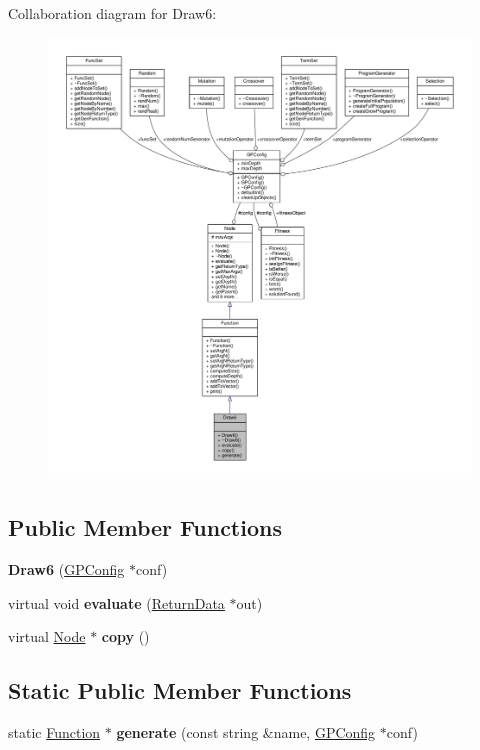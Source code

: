 Collaboration diagram for Draw6\+:
\nopagebreak
\begin{figure}[H]
\begin{center}
\leavevmode
\includegraphics[width=350pt]{classDraw6__coll__graph}
\end{center}
\end{figure}
\subsection*{Public Member Functions}
\begin{DoxyCompactItemize}
\item 
\hypertarget{classDraw6_a3ce8484795df7bd08600ee8a7d457852}{}\label{classDraw6_a3ce8484795df7bd08600ee8a7d457852} 
{\bfseries Draw6} (\hyperlink{classGPConfig}{G\+P\+Config} $\ast$conf)
\item 
\hypertarget{classDraw6_afc1c9a9b88e1857dc72e9d92abe7a701}{}\label{classDraw6_afc1c9a9b88e1857dc72e9d92abe7a701} 
virtual void {\bfseries evaluate} (\hyperlink{classReturnData}{Return\+Data} $\ast$out)
\item 
\hypertarget{classDraw6_a005e2fba5cbe94cf402f242a05e86cd2}{}\label{classDraw6_a005e2fba5cbe94cf402f242a05e86cd2} 
virtual \hyperlink{classNode}{Node} $\ast$ {\bfseries copy} ()
\end{DoxyCompactItemize}
\subsection*{Static Public Member Functions}
\begin{DoxyCompactItemize}
\item 
\hypertarget{classDraw6_afc0f21375d2221fc5b558e7144e3e59d}{}\label{classDraw6_afc0f21375d2221fc5b558e7144e3e59d} 
static \hyperlink{classFunction}{Function} $\ast$ {\bfseries generate} (const string \&name, \hyperlink{classGPConfig}{G\+P\+Config} $\ast$conf)
\end{DoxyCompactItemize}
